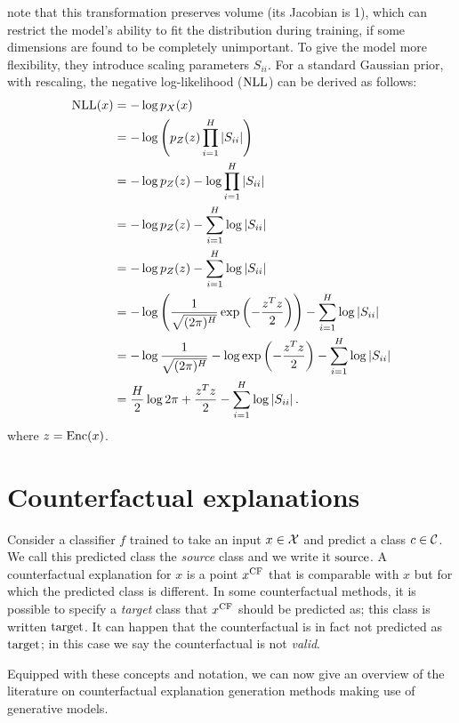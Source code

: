 \documentclass[../main.tex]{subfiles}
\begin{document}
\citeauthor{dinhNICE2015} note that this transformation preserves volume (its Jacobian is 1), which can restrict the model's ability to fit the distribution during training, \eg{} if some dimensions are found to be completely unimportant.
To give the model more flexibility, they introduce scaling parameters $S_{ii}$.
For a standard Gaussian prior, with rescaling, the negative log-likelihood ($\text{NLL}$) can be derived as follows:
\begin{align*}
    \text{NLL}(x)
     & = - \log p_X(x)                                                                               \\
     & = - \log \left( p_Z(z) \prod_{i=1}^H \left\lvert S_{ii}\right\rvert \right)                            \\
     & = - \log p_Z(z) - \log \prod_{i=1}^H \left\lvert S_{ii}\right\rvert                                    \\
     & = - \log p_Z(z) - \sum_{i=1}^H \log \left\lvert S_{ii}\right\rvert                                     \\
     & = - \log p_Z(z) - \sum_{i=1}^H \log \left\lvert S_{ii}\right\rvert                                     \\
     & = - \log \left( \frac{1}{\sqrt{(2 \pi)^H}} \exp\left(- \frac{z^T z}{2}\right)\right)
    - \sum_{i=1}^H \log \left\lvert S_{ii}\right\rvert                                                        \\
     & = - \log \frac{1}{\sqrt{(2 \pi)^H}}
    - \log \exp\left(- \frac{z^T z}{2}\right)
    - \sum_{i=1}^H \log \left\lvert S_{ii}\right\rvert                                                        \\
     & = \frac{H}{2} \log 2 \pi
    +  \frac{z^T z}{2}
    - \sum_{i=1}^H \log \left\lvert S_{ii}\right\rvert.
\end{align*}
where $z = \operatorname{Enc}(x)$.

\section{Counterfactual explanations}

Consider a classifier $f$ trained to take an input $x \in \mathcal{X}$ and predict a class $c \in \mathcal{C}$.
We call this predicted class the \emph{source} class and we write it $\mathrm{source}$.
A counterfactual explanation for $x$ is a point $x^\mathrm{CF}$ that is comparable with $x$ but for which the predicted
class is different.
In some counterfactual methods,  it is possible to specify a \emph{target} class that $x^\mathrm{CF}$ should be predicted as;
this class is written $\mathrm{target}$.
It can happen that the counterfactual is in fact not predicted as $\mathrm{target}$; in this case we say the counterfactual is
not \emph{valid}.

Equipped with these concepts and notation, we can now give an overview of the literature on counterfactual explanation generation methods making use of generative models.
\end{document}
